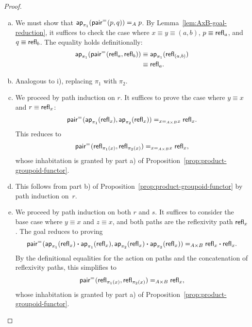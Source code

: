\begin{proof}${}$
    \begin{enumerate}[a),font=\upshape]
        \item We must show that $\mathsf{ap}_{\pi_1}(\mathsf{pair}^{\mathrel{=_{}}}(p,q))\mathrel{=_{A}} p$. By Lemma~\ref{lem:AxB-goal-reduction}, it suffices to check the case where $x\equiv y \equiv (a,b)$, $p\equiv\mathsf{refl}_a$, and $q\equiv\mathsf{refl}_b$. The equality holds definitionally:
        \begin{align*}
            \mathsf{ap}_{\pi_1}(\mathsf{pair}^{\mathrel{=_{}}}(\mathsf{refl}_a,\mathsf{refl}_b))
            &\equiv\mathsf{ap}_{\pi_1}(\mathsf{refl}_{(a,b)})\\
            &\equiv\mathsf{refl}_a.
        \end{align*}
        
        \item Analogous to i), replacing $\pi_1$ with $\pi_2$.
        
        \item We proceed by path induction on $r$. It suffices to prove the case where $y\equiv x$ and $r\equiv\mathsf{refl}_x$:
        \[
            \mathsf{pair}^{\mathrel{=_{}}}(\mathsf{ap}_{\pi_1}(\mathsf{refl}_x),\mathsf{ap}_{\pi_2}(\mathsf{refl}_x)) \mathrel{=_{x\mathrel{=_{A\times B}}x}} \mathsf{refl}_x.
        \]
        This reduces to
        \[
            \mathsf{pair}^{\mathrel{=_{}}}(\mathsf{refl}_{\pi_1(x)},\mathsf{refl}_{\pi_2(x)}) \mathrel{=_{x\mathrel{=_{A\times B}}x}} \mathsf{refl}_x,
        \]
        whose inhabitation is granted by part a) of Proposition~\ref{prop:product-groupoid-functor}.
        
        \item This follows from part b) of Proposition~\ref{prop:product-groupoid-functor} by path induction on~$r$.
        
        \item We proceed by path induction on both\/ $r$ and\/ $s$. It suffices to consider the base case where\/ $y\equiv x$ and\/ $z\equiv x$, and both paths are the reflexivity path\/ $\mathsf{refl}_x$. The goal reduces to proving
        \[
            \mathsf{pair}^{\mathrel{=_{}}}(\mathsf{ap}_{\pi_1}(\mathsf{refl}_x)\mathbin{\boldsymbol{\cdot}}\mathsf{ap}_{\pi_1}(\mathsf{refl}_x), \mathsf{ap}_{\pi_2}(\mathsf{refl}_x)\mathbin{\boldsymbol{\cdot}}\mathsf{ap}_{\pi_2}(\mathsf{refl}_x)) \mathrel{=_{A\times B}} \mathsf{refl}_x\mathbin{\boldsymbol{\cdot}}\mathsf{refl}_x.
        \]
        By the definitional equalities for the action on paths and the concatenation of reflexivity paths, this simplifies to
        \[
            \mathsf{pair}^{\mathrel{=_{}}}(\mathsf{refl}_{\pi_1(x)}, \mathsf{refl}_{\pi_2(x)}) \mathrel{=_{A\times B}} \mathsf{refl}_x,
        \]
        whose inhabitation is granted by part a) of Proposition~\ref{prop:product-groupoid-functor}.
    \end{enumerate}
\end{proof}


